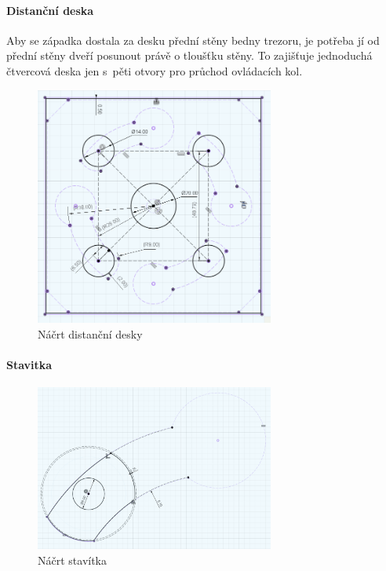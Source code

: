 \paragraph{Distanční deska}

Aby se západka dostala za desku přední stěny bedny trezoru, je potřeba jí od přední stěny dveří posunout právě o tloušťku stěny. To zajišťuje jednoduchá čtvercová deska jen s~pěti otvory
pro průchod ovládacích kol.


\begin{figure}
	\centering
    \includegraphics[width=0.7\textwidth]{kapitoly/obrazky/M3/distancka.png}
    \caption{Náčrt distanční desky}
    \label{fig:M3-distancka}
\end{figure}


\paragraph{Stavitka} %
\begin{figure}
	\centering
    \includegraphics[width=0.7\textwidth]{kapitoly/obrazky/M3/kamen.png}
    \caption{Náčrt stavítka}
    \label{fig:M3-kamen}
\end{figure}

